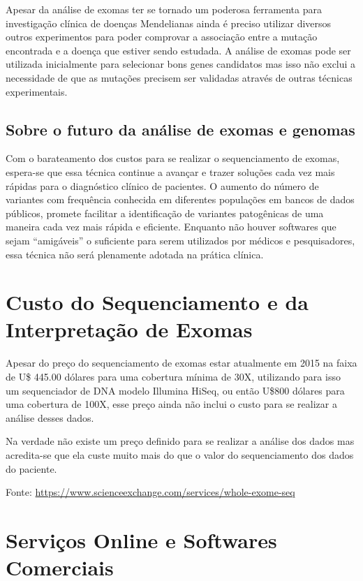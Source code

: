 Apesar da análise de exomas ter se tornado um poderosa ferramenta para investigação clínica de doenças Mendelianas ainda é preciso utilizar diversos outros experimentos para poder comprovar a associação entre a mutação encontrada e a doença que estiver sendo estudada. A análise de exomas pode ser utilizada inicialmente para selecionar bons genes candidatos mas isso não exclui a necessidade de que as mutações precisem ser validadas através de outras técnicas experimentais.

\subsection{Sobre o futuro da análise de exomas e genomas}

Com o barateamento dos custos para se realizar o sequenciamento de exomas, espera-se que essa técnica continue a avançar e trazer soluções cada vez mais rápidas para o diagnóstico clínico de pacientes. O aumento do número de variantes com frequência conhecida em diferentes populações em bancos de dados públicos, promete facilitar a identificação de variantes patogênicas de uma maneira cada vez mais rápida e eficiente. Enquanto não houver softwares que sejam ``amigáveis'' o suficiente para serem utilizados por médicos e pesquisadores, essa técnica não será plenamente adotada na prática clínica.

\section{Custo do Sequenciamento e da Interpretação de Exomas}

Apesar do preço do sequenciamento de exomas estar atualmente em 2015 na faixa de U\$ 445.00 dólares para uma cobertura mínima de 30X, utilizando para isso um sequenciador de DNA modelo Illumina HiSeq, ou então U\$800 dólares para uma cobertura de 100X, esse preço ainda não inclui o custo para se realizar a análise desses dados.

Na verdade não existe um preço definido para se realizar a análise dos dados mas acredita-se que ela custe muito mais do que o valor do sequenciamento dos dados do paciente.

Fonte: \url{https://www.scienceexchange.com/services/whole-exome-seq}

\section{Serviços Online e Softwares Comerciais}

